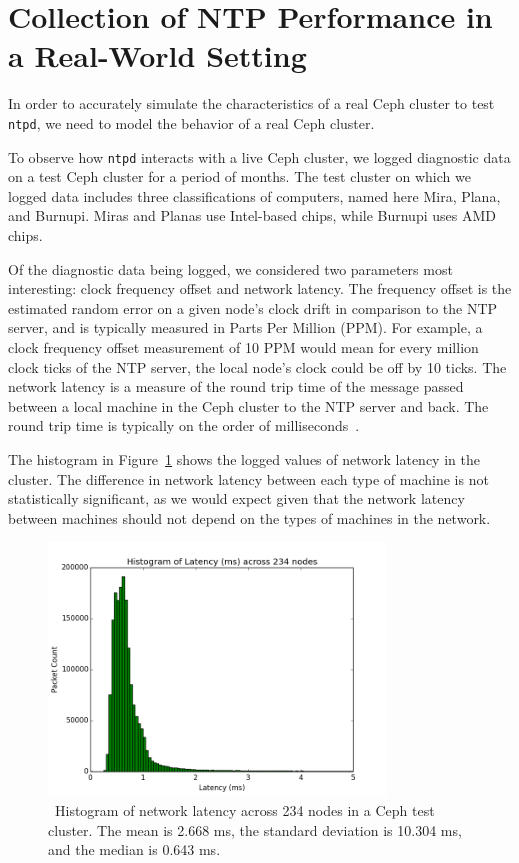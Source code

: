 \section{Collection of NTP Performance in a Real-World Setting}

In order to accurately simulate the characteristics of a real Ceph
cluster to test \texttt{ntpd}, we need to model the behavior of a real
Ceph cluster.

To observe how \texttt{ntpd} interacts with a live Ceph cluster, we
logged diagnostic data on a test Ceph cluster for a period of months.
The test cluster on which we logged data includes three
classifications of computers, named here Mira, Plana, and
Burnupi. Miras and Planas use Intel-based chips, while Burnupi uses
AMD chips.

Of the diagnostic data being logged, we considered two parameters most
interesting: clock frequency offset and network latency.  The
frequency offset is the estimated random error on a given node's clock
drift in comparison to the NTP server, and is typically measured in
Parts Per Million (PPM). For example, a clock frequency offset
measurement of 10 PPM would mean for every million clock ticks of the
NTP server, the local
node's clock could be off by 10 ticks. The network latency is a
measure of the round trip time of the message passed between a local
machine in the Ceph cluster to the NTP server and back. The round trip
time is typically on the order of milliseconds~\citep{Sage}.

The histogram in Figure~\ref{fig:latency-hist} shows the logged values
of network latency in the cluster. The difference in network latency
between each type of machine is not statistically significant, as we
would expect given that the network latency between machines should
not depend on the types of machines in the network.

\begin{figure}[h]
  \centering
  \caption{~Histogram of network latency across 234 nodes in a Ceph test cluster. The mean is 2.668 ms, the 
  standard deviation is 10.304 ms, and the median is 0.643 ms.} 
  \label{fig:latency-hist}
  \includegraphics[width=0.8\textwidth]{latency-hist.png}
\end{figure}

